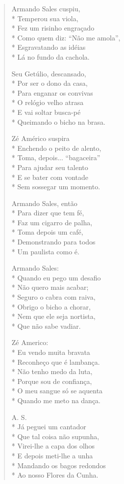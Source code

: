 \begin{verse}
Armando Sales cuspiu,\\*
Temperou sua viola,\\*
Fez um risinho engraçado\\*
Como quem diz: “Não me amola”,\\*
Esgravatando as idéias\\*
Lá no fundo da cachola.

Seu Getúlio, descansado,\\*
Por ser o dono da casa,\\*
Para enganar os convivas\\*
O relógio velho atrasa\\*
E vai soltar busca-pé\\*
Queimando o bicho na brasa.

Zé Américo suspira\\*
Enchendo o peito de alento,\\*
Toma, depois... “bagaceira”\\*
Para ajudar seu talento\\*
E se bater com vontade \\*
Sem sossegar um momento.

Armando Sales, então\\*
Para dizer que tem fé,\\*
Faz um cigarro de palha,\\*
Toma depois um café,\\*
Demonstrando para todos\\*
Um paulista como é.

Armando Sales:\\*
Quando eu pego um desafio\\*
Não quero mais acabar;\\*
Seguro o cabra com raiva,\\*
Obrigo o bicho a chorar,\\*
Nem que ele seja nortista,\\*
Que não sabe vadiar.

Zé Americo: \\*
Eu vendo muita bravata\\*
Reconheço que é lambança.\\*
Não tenho medo da luta,\\*
Porque sou de confiança,\\*
O meu sangue só se aquenta\\*
Quando me meto na dança.

A. S.\\*
Já peguei um cantador\\*
Que tal coisa não supunha,\\*
Virei-lhe a capa dos olhos\\*
E depois meti-lhe a unha\\*
Mandando os bagos redondos\\*
Ao nosso Flores da Cunha.


\end{verse}
